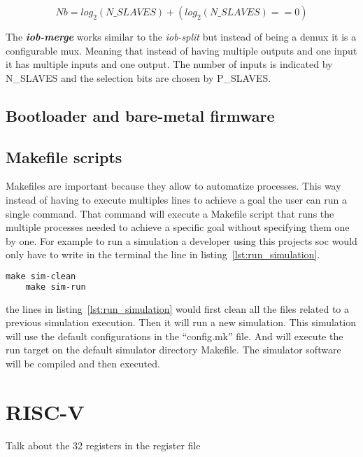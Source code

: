 \begin{equation}
    \label{eq:number_bits}
    Nb = log_2(N\_SLAVES)+(log_2(N\_SLAVES)==0)
\end{equation}

The \textbf{\textit{iob-merge}} works similar to the \textit{iob-split} but instead of being a \acrshort{demux} it is a configurable \acrfull{mux}. Meaning that instead of having multiple outputs and one input it has multiple inputs and one output. The number of inputs is indicated by N\_SLAVES and the selection bits are chosen by P\_SLAVES.

\subsection{Bootloader and bare-metal firmware}

\subsection{Makefile scripts}
Makefiles are important because they allow to automatize processes. This way instead of having to execute multiples lines to achieve a goal the user can run a single command. That command will execute a Makefile script that runs the multiple processes needed to achieve a specific goal without specifying them one by one.
For example to run a simulation a developer using this projects \acrshort{soc} would only have to write in the terminal the line in listing~\ref{lst:run_simulation}.

\begin{lstlisting}[language=make, caption={Run a simulation.}, label=lst:run_simulation]
    make sim-clean
    make sim-run
\end{lstlisting}

the lines in listing~\ref{lst:run_simulation} would first clean all the files related to a previous simulation execution. Then it will run a new simulation. This simulation will use the default configurations in the \enquote{config.mk} file. And will execute the run target on the default simulator directory Makefile. The simulator software will be compiled and then executed.

\section{RISC-V}
\label{section:riscv}
Talk about the 32 registers in the register file

